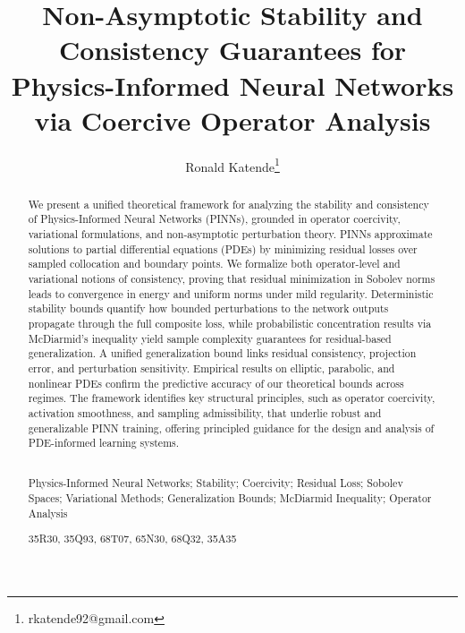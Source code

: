 \documentclass[11pt, a4paper]{article}
\title{Non-Asymptotic Stability and Consistency Guarantees for Physics-Informed Neural Networks via Coercive Operator Analysis}
\date{}
\author[1,2]{Ronald Katende\footnote{rkatende92@gmail.com}}
\affil[1]{Department of Mathematics, Kabale University, Kikungiri Hill, P.O. Box 317, Kabale, Uganda}
\affil[2]{Department of Mathematics, Makerere University, P.O. BOx 7062, Kampala, Uganda}
\begin{document}
\maketitle

\begin{abstract}
\noindent 
We present a unified theoretical framework for analyzing the stability and consistency of Physics-Informed Neural Networks (PINNs), grounded in operator coercivity, variational formulations, and non-asymptotic perturbation theory. PINNs approximate solutions to partial differential equations (PDEs) by minimizing residual losses over sampled collocation and boundary points. We formalize both operator-level and variational notions of consistency, proving that residual minimization in Sobolev norms leads to convergence in energy and uniform norms under mild regularity. Deterministic stability bounds quantify how bounded perturbations to the network outputs propagate through the full composite loss, while probabilistic concentration results via McDiarmid's inequality yield sample complexity guarantees for residual-based generalization. A unified generalization bound links residual consistency, projection error, and perturbation sensitivity. Empirical results on elliptic, parabolic, and nonlinear PDEs confirm the predictive accuracy of our theoretical bounds across regimes. The framework identifies key structural principles, such as operator coercivity, activation smoothness, and sampling admissibility, that underlie robust and generalizable PINN training, offering principled guidance for the design and analysis of PDE-informed learning systems.\\\
\vspace{0.2em}

 Physics-Informed Neural Networks; Stability; Coercivity; Residual Loss;  Sobolev Spaces; Variational Methods; Generalization Bounds; McDiarmid Inequality; Operator Analysis\\
\vspace{0.2em}

\noindent\vspace{1em}
    35R30,    %
    35Q93,    %
    68T07,    %
    65N30,    %
    68Q32,    %
    35A35     %
\end{abstract}
\end{document}
